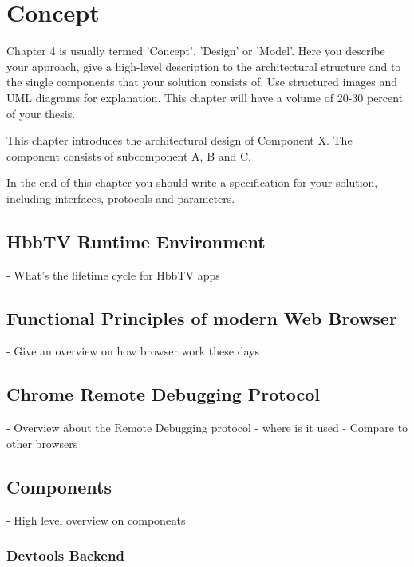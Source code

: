 \chapter{Concept\label{cha:chapter4}}

Chapter 4 is usually termed 'Concept', 'Design' or 'Model'. Here you describe your approach, give a
high-level description to the architectural structure and to the single components that your solution
consists of. Use structured images and UML diagrams for explanation. This chapter will have a volume
of 20-30 percent of your thesis.

This chapter introduces the architectural design of Component X. The component consists of
subcomponent A, B and C.

In the end of this chapter you should write a specification for your solution, including
interfaces, protocols and parameters.

\section{HbbTV Runtime Environment\label{sec:hbbtvruntimeenvironment}}

- What's the lifetime cycle for HbbTV apps

\section{Functional Principles of modern Web Browser\label{sec:howbrowserwork}}

- Give an overview on how browser work these days

\section{Chrome Remote Debugging Protocol\label{sec:crdp}}

- Overview about the Remote Debugging protocol
- where is it used
- Compare to other browsers

\section{Components\label{sec:components}}

- High level overview on components

\subsection{Devtools Backend\label{sec:devtoolsbackend}}

